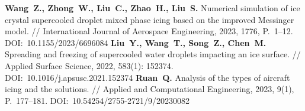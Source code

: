 \begin{thebibliography}{99}
%
\textbf{Wang~Z., Zhong~W., Liu~C., Zhao~H., Liu~S.} Numerical simulation of ice crystal supercooled droplet mixed phase icing based on the improved Messinger model. // International Journal of Aerospace Engineering, 2023, 1776, P.~1–12. DOI:~10.1155/2023/6696084
%
\textbf{Liu~Y., Wang~T., Song~Z., Chen~M.} Spreading and freezing of supercooled water droplets impacting an ice surface. // Applied Surface Science, 2022, 583(1): 152374. DOI:~10.1016/j.apsusc.2021.152374
%
\textbf{Ruan~Q.} Analysis of the types of aircraft icing and the solutions. // Applied and Computational Engineering, 2023, 9(1), P.~177–181. DOI:~10.54254/2755-2721/9/20230082
%






%
%







\end{thebibliography}
